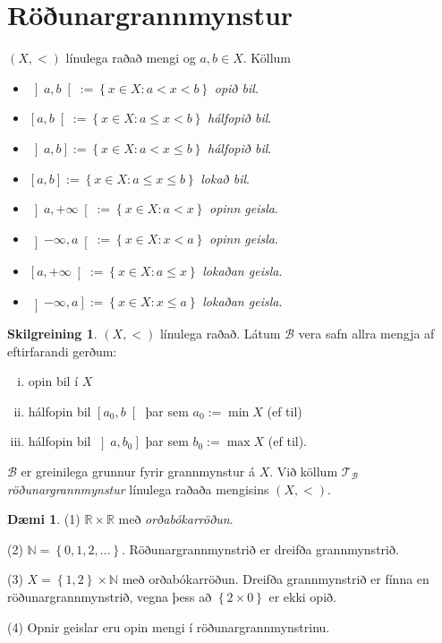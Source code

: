 \documentclass[a4paper,icelandic]{book}
\theoremstyle{definition}
\newtheorem{skilgr}{Skilgreining}[section]
\newtheorem{daemi}{Dæmi}[section]
\theoremstyle{plain}
\theoremstyle{remark}
\newcommand{\R}{\mathbb{R}} %
\newcommand{\N}{\mathbb{N}} %
\begin{document}
\section{Röðunargrannmynstur}
$(X,<)$ línulega raðað mengi og $a,b\in X$. Köllum
\begin{itemize}
\item $\left]a,b\right[ := \left\{ x\in X: a<x<b \right\}$ \emph{opið
    bil}.
\item $\left[a,b\right[ := \left\{ x\in X: a\leq x < b \right\}$ \emph{hálfopið
    bil}.
\item $\left]a,b\right] := \left\{ x\in X: a < x \leq b \right\}$ \emph{hálfopið
    bil}.
\item $\left[a,b\right] := \left\{ x\in X: a\leq x \leq b \right\}$ \emph{lokað
    bil}.
\item $\left]a,+\infty\right[ := \left\{ x\in X : a < x \right\}$ \emph{opinn
    geisla}.
\item $\left]-\infty,a\right[ := \left\{ x\in X : x < a \right\}$ \emph{opinn
    geisla}.
\item $\left[a,+\infty\right[ := \left\{ x\in X : a\leq x \right\}$
  \emph{lokaðan geisla}.
\item $\left]-\infty,a\right] := \left\{ x\in X : x\leq a \right\}$
  \emph{lokaðan geisla}.
\end{itemize}
\begin{skilgr}
  $(X,<)$ línulega raðað. Látum $\mathcal B$ vera safn allra mengja af
  eftirfarandi gerðum:
  \begin{enumerate}[(i)]
    \item opin bil í $X$
    \item hálfopin bil $\left[a_0, b\right[$ þar sem $a_0 := \min X$ (ef til)
    \item hálfopin bil $\left]a, b_0\right]$ þar sem $b_0 := \max X$ (ef til). 
  \end{enumerate}
  $\mathcal B$ er greinilega grunnur fyrir grannmynstur á $X$. Við köllum
  $\mathcal T_{\mathcal B}$
  \emph{röðunargrannmynstur} línulega raðaða
  mengisins $(X,<)$.
\end{skilgr}
\begin{daemi}
  (1) $\R\times\R$ með \emph{orðabókarröðun}.

  (2) $\N = \left\{ 0,1,2,\dots \right\}$. Röðunargrannmynstrið er dreifða
  grannmynstrið.

  (3) $X = \left\{ 1,2 \right\}\times\N$ með orðabókarröðun.  Dreifða
  grannmynstrið er fínna en röðunargrannmynstrið, vegna þess að $\left\{ 2\times
    0 \right\}$ er ekki opið.

  (4) Opnir geislar eru opin mengi í röðunargrannmynstrinu.
\end{daemi}
\end{document}
